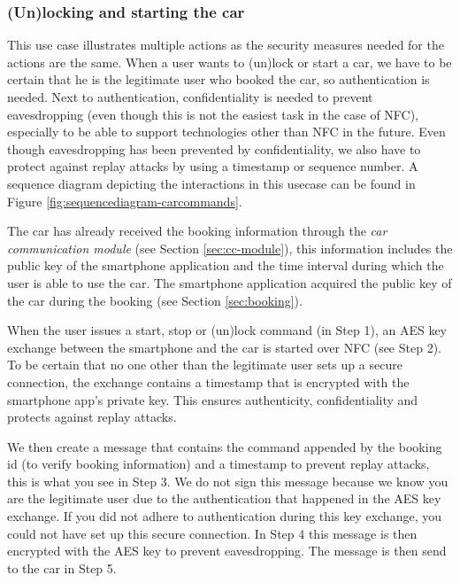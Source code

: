 \documentclass[12pt,a4paper, oneside]{article}
\newlength{\drop}
\begin{document}
\subsubsection{(Un)locking and starting the car}\label{sec:unlocking-starting-car}
\par This use case illustrates multiple actions as the security measures needed for the actions are the same. When a user wants to (un)lock or start a car, we have to be certain that he is the legitimate user who booked the car, so authentication is needed. Next to authentication, confidentiality is needed to prevent eavesdropping (even though this is not the easiest task in the case of NFC), especially to be able to support technologies other than NFC in the future. Even though eavesdropping has been prevented by confidentiality, we also have to protect against replay attacks by using a timestamp or sequence number. A sequence diagram depicting the interactions in this usecase can be found in Figure \ref{fig:sequencediagram-carcommands}.

\par The car has already received the booking information through the \textit{car communication module} (see Section \ref{sec:cc-module}), this information includes the public key of the smartphone application and the time interval during which the user is able to use the car. The smartphone application acquired the public key of the car during the booking (see Section \ref{sec:booking}).

\par When the user issues a start, stop or (un)lock command (in Step 1), an AES key exchange between the smartphone and the car is started over NFC (see Step 2). To be certain that no one other than the legitimate user sets up a secure connection, the exchange contains a timestamp that is encrypted with the smartphone app's private key. This ensures authenticity, confidentiality and protects against replay attacks.

\par We then create a message that contains the command  appended by the booking id (to verify booking information) and a timestamp to prevent replay attacks, this is what you see in Step 3. We do not sign this message because we know you are the legitimate user due to the authentication that happened in the AES key exchange. If you did not adhere to authentication during this key exchange, you could not have set up this secure connection. In Step 4 this message is then encrypted with the AES key to prevent eavesdropping. The message is then send to the car in Step 5.
\end{document}
